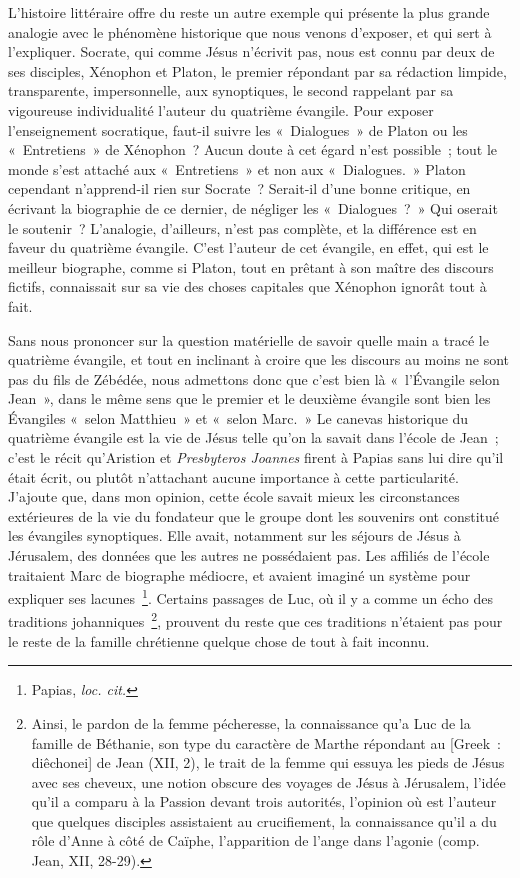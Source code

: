 \documentclass[french,twoside]{book} %
\begin{document}
L’histoire littéraire offre du reste un autre exemple qui présente la plus grande analogie avec le phénomène historique que nous venons d’exposer, et qui sert à l’expliquer. Socrate, qui comme Jésus n’écrivit pas, nous est connu par deux de ses disciples, Xénophon et Platon, le premier répondant par sa rédaction limpide, transparente, impersonnelle, aux synoptiques, le second rappelant par sa vigoureuse individualité l’auteur du quatrième évangile. Pour exposer l’enseignement socratique, faut-il suivre les « Dialogues » de Platon ou les « Entretiens » de Xénophon ? Aucun doute à cet égard n’est possible ; tout le monde s’est attaché aux « Entretiens » et non aux « Dialogues. » Platon cependant n’apprend-il rien sur Socrate ? Serait-il d’une bonne critique, en écrivant la biographie de ce dernier, de négliger les « Dialogues ? » Qui oserait le soutenir ? L’analogie, d’ailleurs, n’est pas complète, et la différence est en faveur du quatrième évangile. C’est l’auteur de cet évangile, en effet, qui est le meilleur biographe, comme si Platon, tout en prêtant à son maître des discours fictifs, connaissait sur sa vie des choses capitales que Xénophon ignorât tout à fait.\par
Sans nous prononcer sur la question matérielle de savoir quelle main a tracé le quatrième évangile, et tout en inclinant à croire que les discours au moins ne sont pas du fils de Zébédée, nous admettons donc que c’est bien là « l’Évangile selon Jean », dans le même sens que le premier et le deuxième évangile sont bien les Évangiles « selon Matthieu » et « selon Marc. » Le canevas historique du quatrième évangile est la vie de Jésus telle qu’on la savait dans l’école de Jean ; c’est le récit qu’Aristion et {\itshape Presbyteros Joannes} firent à Papias sans lui dire qu’il était écrit, ou plutôt n’attachant aucune importance à cette particularité. J’ajoute que, dans mon opinion, cette école savait mieux les circonstances extérieures de la vie du fondateur que le groupe dont les souvenirs ont constitué les évangiles synoptiques. Elle avait, notamment sur les séjours de Jésus à Jérusalem, des données que les autres ne possédaient pas. Les affiliés de l’école traitaient Marc de biographe médiocre, et avaient imaginé un système pour expliquer ses lacunes \footnote{ Papias, {\itshape loc. cit.}}. Certains passages de Luc, où il y a comme un écho des traditions johanniques \footnote{Ainsi, le pardon de la femme pécheresse, la connaissance qu’a Luc de la famille de Béthanie, son type du caractère de Marthe répondant au [Greek : diêchonei] de Jean (XII, 2), le trait de la femme qui essuya les pieds de Jésus avec ses cheveux, une notion obscure des voyages de Jésus à Jérusalem, l’idée qu’il a comparu à la Passion devant trois autorités, l’opinion où est l’auteur que quelques disciples assistaient au crucifiement, la connaissance qu’il a du rôle d’Anne à côté de Caïphe, l’apparition de l’ange dans l’agonie (comp. Jean, XII, 28-29).}, prouvent du reste que ces traditions n’étaient pas pour le reste de la famille chrétienne quelque chose de tout à fait inconnu.\par
\end{document}

